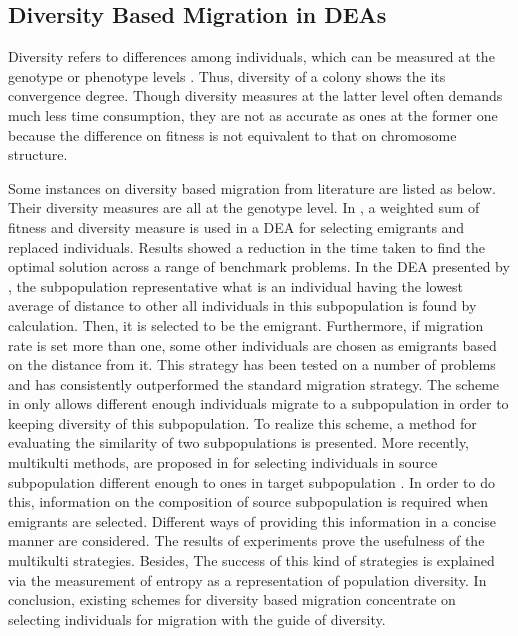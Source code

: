 \documentclass[journal,onecolumn]{IEEEtran}
\begin{document}
\subsection{Diversity Based Migration in DEAs}
Diversity refers to differences among individuals, which can be measured at the genotype or phenotype levels \cite{vcrepinvsek2013exploration}.
Thus, diversity of a colony shows the its convergence degree.
Though diversity measures at the latter level often demands much less time consumption, they are not as accurate as ones at the former one because the difference on fitness is not equivalent to that on chromosome structure.

Some instances on diversity based migration from literature are listed as below.
Their diversity measures are all at the genotype level.
In \cite{denzinger2003improving}, a weighted sum of fitness and diversity measure is used in a DEA for selecting emigrants and replaced individuals.
Results showed a reduction in the time taken to find the optimal solution across a range of benchmark problems.
In the DEA presented by \cite{power2005promoting}, the subpopulation representative what is an individual having the lowest average of distance to other all individuals in this subpopulation is found by calculation.
Then, it is selected to be the emigrant.
Furthermore, if migration rate is set more than one, some other individuals are chosen as emigrants based on the distance from it.
This strategy has been tested on a number of problems and has consistently outperformed the standard migration strategy.
The scheme in \cite{wei2009maintain} only allows different enough individuals migrate to a subpopulation in order to keeping diversity of this subpopulation.
To realize this scheme, a method for evaluating the similarity of two subpopulations is presented.
More recently, multikulti methods, are proposed in \cite{araujo2011diversity} for selecting individuals in source subpopulation different enough to ones in target subpopulation .
In order to do this, information on the composition of source subpopulation is required when emigrants are selected.
Different ways of providing this information in a concise manner are considered.
The results of experiments prove the usefulness of the multikulti strategies.
Besides, The success of this kind of strategies is explained via the measurement of entropy as a representation of population diversity.
In conclusion, existing schemes for diversity based migration concentrate on selecting individuals for migration with the guide of diversity.
\end{document}
